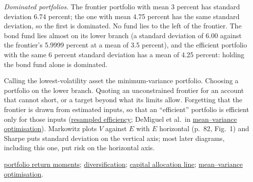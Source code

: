 \begin{qfmethod}
\emph{Dominated portfolios.} The frontier portfolio with mean 3 percent has standard deviation 6.74 percent; the one with mean 4.75 percent has the same standard deviation, so the first is dominated. No fund lies to the left of the frontier. The bond fund lies almost on its lower branch (a standard deviation of 6.00 against the frontier's 5.9999 percent at a mean of 3.5 percent), and the efficient portfolio with the same 6 percent standard deviation has a mean of 4.25 percent: holding the bond fund alone is dominated.

\begin{center}

\end{center}

 Calling the lowest-volatility asset the minimum-variance portfolio. Choosing a portfolio on the lower branch. Quoting an unconstrained frontier for an account that cannot short, or a target beyond what its limits allow. Forgetting that the frontier is drawn from estimated inputs, so that an ``efficient'' portfolio is efficient only for those inputs (\hyperref[meth:resampled-efficiency]{resampled efficiency}; DeMiguel et al.\ in \hyperref[mod:mean-variance-portfolio-optimisation]{mean--variance optimisation}). Markowitz plots $V$ against $E$ with $E$ horizontal (p.~82, Fig.~1) and Sharpe puts standard deviation on the vertical axis; most later diagrams, including this one, put risk on the horizontal axis.

 \hyperref[meth:portfolio-return-moments]{portfolio return moments}; \hyperref[mech:diversification-correlation]{diversification}; \hyperref[meth:capital-allocation-line]{capital allocation line}; \hyperref[mod:mean-variance-portfolio-optimisation]{mean--variance optimisation}.

\end{qfmethod}


